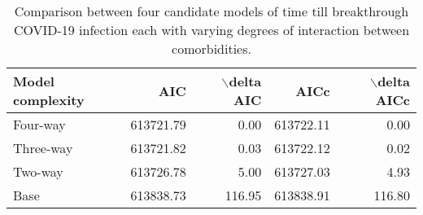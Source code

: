 \begin{table}[!htbp]
\centering
\begin{tabular}{lrrrr}
  \hline
Model complexity & AIC & $\backslash$delta AIC & AICc & $\backslash$delta AICc \\ 
  \hline
Four-way & 613721.79 & 0.00 & 613722.11 & 0.00 \\ 
  Three-way & 613721.82 & 0.03 & 613722.12 & 0.02 \\ 
  Two-way & 613726.78 & 5.00 & 613727.03 & 4.93 \\ 
  Base & 613838.73 & 116.95 & 613838.91 & 116.80 \\ 
   \hline
\end{tabular}
\caption{Comparison between four candidate models of time till breakthrough COVID-19 infection each with varying degrees of interaction between comorbidities.} 
\label{tab:breakthrough_aic}
\end{table}
